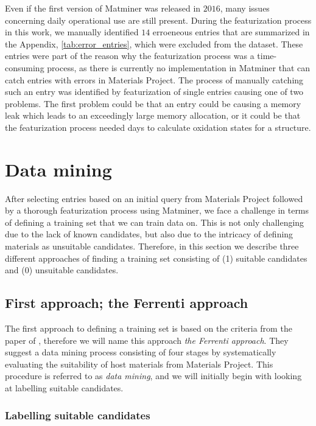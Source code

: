 Even if the first version of Matminer was released in $2016$, many issues concerning daily operational use are still present. During the featurization process in this work, we manually identified $14$ erroeneous entries that are summarized in the Appendix, \autoref{tab:error_entries}, which were excluded from the dataset. These entries were part of the reason why the featurization process was a time-consuming process, as there is currently no implementation in Matminer that can catch entries with errors in Materials Project. The process of manually catching such an entry was identified by featurization of single entries causing one of two problems. The first problem could be that an entry could be causing a memory leak which leads to an exceedingly large memory allocation, or it could be that the featurization process needed days to calculate oxidation states for a structure.

\section{Data mining}
\label{sec:data mining}
After selecting entries based on an initial query from Materials Project followed by a thorough featurization process using Matminer, we face a challenge in terms of defining a training set that we can train data on. This is not only challenging due to the lack of known candidates, but also due to the intricacy of defining materials as unsuitable candidates. Therefore, in this section we describe three different approaches of finding a training set consisting of (1) suitable candidates and (0) unsuitable candidates.

\subsection{First approach; the Ferrenti approach}

The first approach to defining a training set is based on the criteria from the paper  of \citeauthor{Ferrenti2020} \cite{Ferrenti2020}, therefore we will name this approach \textit{the Ferrenti approach}. They suggest a data mining process consisting of four stages by systematically evaluating the suitability of host materials from Materials Project. This procedure is referred to as \textit{data mining}, and we will initially begin with looking at labelling suitable candidates.

\subsubsection{Labelling suitable candidates}

